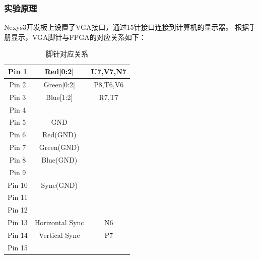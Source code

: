 \documentclass{ctexart}
\begin{document}
            \subsubsection{实验原理}
            
            Nexys3开发板上设置了VGA接口，通过15针接口连接到计算机的显示器。
            根据手册显示，VGA脚针与FPGA的对应关系如下：
            \begin{table}
                \centering
                \begin{tabular}{|c|c|c|}
                    \hline Pin 1  & Red[0:2]        & U7,V7,N7 \\ 
                    \hline Pin 2  & Green[0:2]      & P8,T6,V6 \\ 
                    \hline Pin 3  & Blue[1:2]       & R7,T7 \\ 
                    \hline Pin 4  &  &  \\ 
                    \hline Pin 5  & GND             &  \\ 
                    \hline Pin 6  & Red(GND)        &  \\ 
                    \hline Pin 7  & Green(GND)      &  \\ 
                    \hline Pin 8  & Blue(GND)       &  \\ 
                    \hline Pin 9  &  &  \\ 
                    \hline Pin 10 & Sync(GND)       &  \\ 
                    \hline Pin 11 &  &  \\ 
                    \hline Pin 12 &  &  \\ 
                    \hline Pin 13 & Horizontal Sync & N6 \\ 
                    \hline Pin 14 & Vertical Sync   & P7 \\ 
                    \hline Pin 15 &  &  \\ 
                    \hline 
                \end{tabular} 
                \caption{脚针对应关系}
            \end{table}
            
\end{document}

